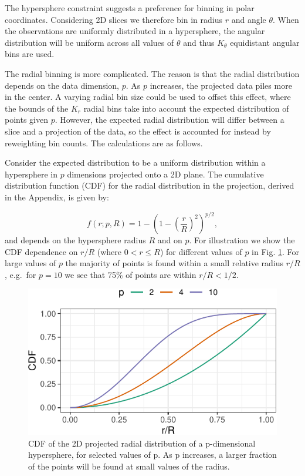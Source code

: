 \documentclass[]{interact}
\theoremstyle{plain}%
\theoremstyle{definition}
\theoremstyle{remark}
\begin{document}
The hypersphere constraint suggests a preference for binning in polar
coordinates. Considering 2D slices we therefore bin in radius \(r\) and
angle \(\theta\). When the observations are uniformly distributed in a
hypersphere, the angular distribution will be uniform across all values
of \(\theta\) and thus \(K_{\theta}\) equidistant angular bins are used.

The radial binning is more complicated. The reason is that the radial
distribution depends on the data dimension, \(p\). As \(p\) increases,
the projected data piles more in the center. A varying radial bin size
could be used to offset this effect, where the bounds of the \(K_r\)
radial bins take into account the expected distribution of points given
\(p\). However, the expected radial distribution will differ between a
slice and a projection of the data, so the effect is accounted for
instead by reweighting bin counts. The calculations are as follows.

Consider the expected distribution to be a uniform distribution within a
hypersphere in \(p\) dimensions projected onto a 2D plane. The
cumulative distribution function (CDF) for the radial distribution in
the projection, derived in the Appendix, is given by:

\begin{equation}
f(r;p,R) = 1-\left(1-\left(\frac{r}{R}\right)^2\right)^{p/2},
\label{eq:cdf}
\end{equation} and depends on the hypersphere radius \(R\) and on \(p\).
For illustration we show the CDF dependence on \(r/R\) (where
\(0<r\leq R\)) for different values of \(p\) in Fig. \ref{fig:cdf}. For
large values of \(p\) the majority of points is found within a small
relative radius \(r/R\), e.g.~for \(p=10\) we see that 75\% of points
are within \(r/R<1/2\).

\begin{figure}

{\centering \includegraphics[width=0.5\linewidth]{section_pursuit_files/figure-latex/cdf-1} 

}

\caption{CDF of the 2D projected radial distribution of a p-dimensional hypersphere, for selected values of p. As p increases, a larger fraction of the points will be found at small values of the radius.}\label{fig:cdf}
\end{figure}
\end{document}
